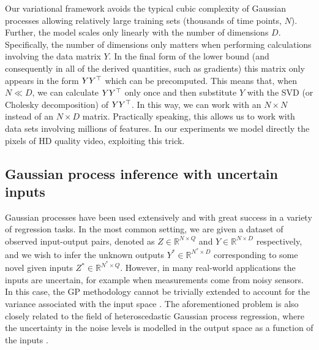 Our variational framework avoids the typical cubic complexity of
Gaussian processes allowing relatively large training sets (thousands
of time points, $N$). Further, the model scales only linearly with the
number of dimensions $D$. Specifically, the number of dimensions only
matters when performing calculations involving the data matrix $Y$. In
the final form of the lower bound (and consequently in all of the
derived quantities, such as gradients) this matrix only appears in the
form $Y Y^{\top}$ which can be precomputed. This means that, when $N \ll
D$, we can calculate $Y Y^{\top}$ only once and then substitute $Y$ with
the SVD (or Cholesky decomposition) of $Y Y^{\top}$. In this way, we can
work with an $N \times N$ instead of an $N \times D$
matrix. Practically speaking, this allows us to work with data sets
involving millions of features. In our experiments we model directly
the pixels of HD quality video, exploiting this trick.






\subsection{Gaussian process inference with uncertain inputs\label{uncertainInputs}}

Gaussian processes have been used extensively and with great success in a variety of regression tasks.
In the most common setting, we are given a dataset of observed input-output pairs, 
denoted as $Z \in \mathbb{R}^{N \times Q}$ and $Y \in \mathbb{R}^{N \times D}$ respectively, 
and we wish to infer the unknown outputs $Y^* \in \mathbb{R}^{N^* \times D}$ corresponding to 
some novel given inputs $Z^* \in \mathbb{R}^{N^* \times Q}$. However, in many real-world applications
the inputs are uncertain, for example when measurements come from noisy sensors.
In this case, the GP methodology cannot be trivially extended to account for the variance
associated with the input space \cite{Girard:uncertain01, mchutchon:gaussian}. 
The aforementioned problem is also closely related to the field of heteroscedastic Gaussian process regression,
where the uncertainty in the noise levels is modelled in the output space as a function of the inputs 
\cite{Kersting:MLH07,Bishop:gps_nips97,gredilla:variationalheteroscedastic11}.

